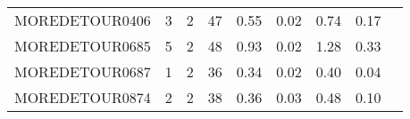 {\begin{tabular}{l|r|r|r|r|r|r|r|l}
MOREDETOUR0406                              & 3                                                                                                 & 2                                                                                                & 47                                                                                                                   & 0.55                            & 0.02                    & {\color[HTML]{00009B} 0.74}    & 0.17                       \\
MOREDETOUR0685                              & 5                                                                                                 & 2                                                                                                & 48                                                                                                                   & 0.93                            & 0.02                    & {\color[HTML]{00009B} 1.28}    & 0.33                       \\
MOREDETOUR0687                              & 1                                                                                                 & 2                                                                                                & 36                                                                                                                   & 0.34                            & 0.02                    & {\color[HTML]{00009B} 0.40}    & 0.04                       \\
MOREDETOUR0874                              & 2                                                                                                 & 2                                                                                                & 38                                                                                                                   & 0.36                            & 0.03                    & {\color[HTML]{00009B} 0.48}    & 0.10                                                         
\end{tabular}%
}